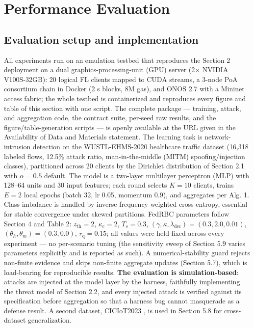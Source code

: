 \documentclass[cmc,article,submit,moreauthors,pdftex]{Definitions/tsp}
\begin{document}
\section{Performance Evaluation}\label{sec:performance-evaluation}

\subsection{Evaluation setup and implementation}\label{sec:evaluation-setup-and-implementation}

All experiments run on an emulation testbed that reproduces the Section 2 deployment on a dual graphics-processing-unit (GPU) server (2$\times$ NVIDIA V100S-32GB): 20 logical FL clients mapped to CUDA streams, a 3-node PoA consortium chain in Docker (2 s blocks, 8M gas), and ONOS 2.7 with a Mininet access fabric; the whole testbed is containerized and reproduces every figure and table of this section with one script. The complete package --- training, attack, and aggregation code, the contract suite, per-seed raw results, and the figure/table-generation scripts --- is openly available at the URL given in the Availability of Data and Materials statement. The learning task is network-intrusion detection on the WUSTL-EHMS-2020 healthcare traffic dataset (16,318 labeled flows, 12.5\% attack ratio, man-in-the-middle (MITM) spoofing/injection classes), partitioned across 20 clients by the Dirichlet distribution of Section 2.1 with $\alpha = 0.5$ default. The model is a two-layer multilayer perceptron (MLP) with 128--64 units and 30 input features; each round selects $K{=}10$ clients, trains $E{=}2$ local epochs (batch 32, lr 0.05, momentum 0.9), and aggregates per Alg. 1. Class imbalance is handled by inverse-frequency weighted cross-entropy, essential for stable convergence under skewed partitions. FedRBC parameters follow Section 4 and Table 2: $z_{\mathrm{th}}{=}2$, $\kappa_c{=}2$, $T_s{=}0.3$, $(\gamma,\kappa,\lambda_{\mathrm{dec}})=(0.3,2.0,0.01)$, $(\theta_h,\theta_m)=(0.3,0.0)$, $r_{\mathrm{q}}{=}0.15$; all values were held fixed across every experiment --- no per-scenario tuning (the sensitivity sweep of Section 5.9 varies parameters explicitly and is reported as such). A numerical-stability guard rejects non-finite evidence and skips non-finite aggregate updates (Section 5.7), which is load-bearing for reproducible results. \textbf{The evaluation is simulation-based}: attacks are injected at the model layer by the harness, faithfully implementing the threat model of Section 2.2, and every injected attack is verified against its specification before aggregation so that a harness bug cannot masquerade as a defense result. A second dataset, CICIoT2023 \cite{ref-52}, is used in Section 5.8 for cross-dataset generalization.
\end{document}
